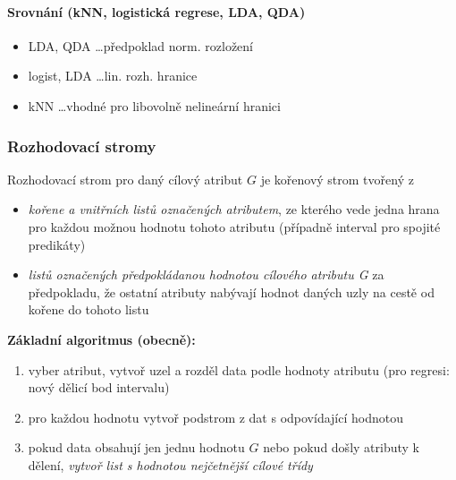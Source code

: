 \documentclass[11pt]{report} %
\numberwithin{equation}{section}
\begin{document}
	\paragraph{Srovnání (kNN, logistická regrese, LDA, QDA)}
	\begin{itemize}	
		\item LDA, QDA \dots předpoklad norm. rozložení
		\item logist, LDA \dots lin. rozh. hranice
		\item kNN \dots vhodné pro libovolně nelineární hranici
	\end{itemize}


\subsubsection{Rozhodovací stromy}
Rozhodovací strom pro daný cílový atribut $G$ je kořenový strom tvořený z 
\begin{itemize}
	\item \textit{kořene a vnitřních listů označených atributem}, ze kterého vede jedna hrana pro každou možnou hodnotu tohoto atributu (případně interval pro spojité predikáty)
	\item \textit{listů označených předpokládanou hodnotou cílového atributu G} za předpokladu, že ostatní atributy nabývají hodnot daných uzly na cestě od kořene do tohoto listu
\end{itemize}

\textbf{Základní algoritmus (obecně):}
\begin{enumerate}
	\item vyber atribut, vytvoř uzel a rozděl data podle hodnoty atributu (pro regresi: nový dělicí bod intervalu)
	\item pro každou hodnotu vytvoř podstrom z dat s odpovídající hodnotou
	\item pokud data obsahují jen jednu hodnotu $G$ nebo pokud došly atributy k dělení, \textit{vytvoř list s hodnotou nejčetnější cílové třídy}
\end{enumerate}
\end{document}
